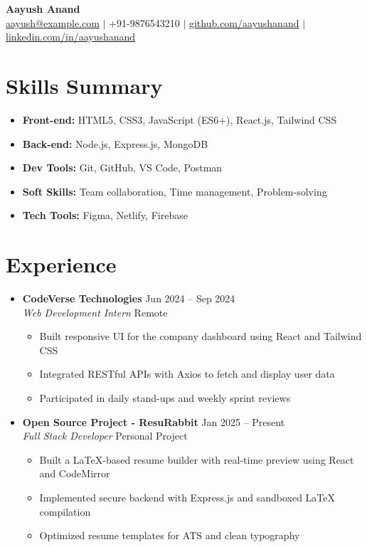 \documentclass[a4paper,10pt,a4]{article}
\newcommand{\resumeSubHeadingListStart}{\begin{itemize}[leftmargin=0.15in, label={}]}
\newcommand{\resumeSubHeadingListEnd}{\end{itemize}}
\newcommand{\resumeSubheading}[4]{
  \item
    \textbf{#1} \hfill {\small #2} \\
    \textit{\small#3} \hfill {\small #4}
}
\newcommand{\resumeItem}[1]{
  \item\small{
    {#1 \vspace{-2pt}}
  }
}
\newcommand{\resumeItemListStart}{\begin{itemize}}
\newcommand{\resumeItemListEnd}{\end{itemize}}
\begin{document}
\begin{center}
  {\LARGE \textbf{Aayush Anand}} \\ \vspace{1pt}
  \href{mailto:aayush@example.com}{aayush@example.com} $|$
  +91-9876543210 $|$
  \href{https://github.com/aayushanand}{github.com/aayushanand} $|$
  \href{https://linkedin.com/in/aayushanand}{linkedin.com/in/aayushanand}
\end{center}

\section*{Skills Summary}
\begin{itemize}[leftmargin=0.15in, label={}]
  \item \textbf{Front-end:} HTML5, CSS3, JavaScript (ES6+), React.js, Tailwind CSS
  \item \textbf{Back-end:} Node.js, Express.js, MongoDB
  \item \textbf{Dev Tools:} Git, GitHub, VS Code, Postman
  \item \textbf{Soft Skills:} Team collaboration, Time management, Problem-solving
  \item \textbf{Tech Tools:} Figma, Netlify, Firebase
\end{itemize}

\section*{Experience}
\resumeSubHeadingListStart

\resumeSubheading
  {CodeVerse Technologies}{Jun 2024 – Sep 2024}
  {Web Development Intern}{Remote}
  \resumeItemListStart
    \resumeItem{Built responsive UI for the company dashboard using React and Tailwind CSS}
    \resumeItem{Integrated RESTful APIs with Axios to fetch and display user data}
    \resumeItem{Participated in daily stand-ups and weekly sprint reviews}
  \resumeItemListEnd

\resumeSubheading
  {Open Source Project - ResuRabbit}{Jan 2025 – Present}
  {Full Stack Developer}{Personal Project}
  \resumeItemListStart
    \resumeItem{Built a LaTeX-based resume builder with real-time preview using React and CodeMirror}
    \resumeItem{Implemented secure backend with Express.js and sandboxed LaTeX compilation}
    \resumeItem{Optimized resume templates for ATS and clean typography}
  \resumeItemListEnd

\resumeSubHeadingListEnd

\end{document}
